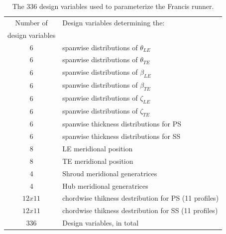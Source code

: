 \begin{table}[h!]
\begin{center}
\begin{tabular}{ |c|l| }
\hline

Number of              & Design variables determining the:\\
design variables       & \\
\hline
6 & spanwise distributions of $\theta_{LE}$\\
\hline
6 & spanwise distributions of $\theta_{TE}$\\
\hline
6 & spanwise distributions of $\beta_{LE}$\\
\hline
6 & spanwise distributions of $\beta_{TE}$\\
\hline
6 & spanwise distributions of $\zeta_{LE}$\\
\hline
6 & spanwise distributions of $\zeta_{TE}$\\
\hline
6 & spanwise thickness distributions for PS \\
\hline
6 & spanwise thickness distributions for SS\\
\hline
8 & LE meridional position\\
\hline
8 & TE meridional position\\
\hline
4 & Shroud meridional generatrices \\
\hline
4 & Hub meridional generatrices\\
\hline
$12 x 11$ & chordwise thikness destribution for PS (11 profiles)\\
\hline
$12 x 11$ & chordwise thikness destribution for SS (11 profiles)\\
\hline
\hline
336 & Design variables, in total \\
\hline   
\end{tabular}
\caption{
The $336$ design variables used to parameterize the Francis runner.}
\label{design_vars}
\end{center}
\end{table}

